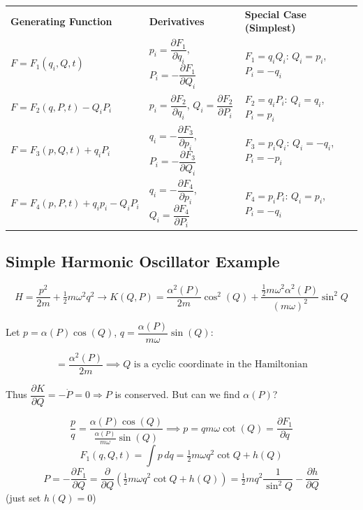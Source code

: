 \begin{center}
\begin{tabular}{lll}
    \textbf{Generating Function} & \textbf{Derivatives} & \textbf{Special Case (Simplest)} \\[6pt]
    $F = F_1(q_i, Q, t)$ & $p_i = \dfrac{\partial F_1}{\partial q_i}$,\; $P_i = -\dfrac{\partial F_1}{\partial Q_i}$ & $F_1 = q_i Q_i$:\; $Q_i = p_i$,\; $P_i = -q_i$ \\[8pt]
    $F = F_2(q, P, t) - Q_i P_i$ & $p_i = \dfrac{\partial F_2}{\partial q_i}$,\; $Q_i = \dfrac{\partial F_2}{\partial P_i}$ & $F_2 = q_i P_i$:\; $Q_i = q_i$,\; $P_i = p_i$ \\[8pt]
    $F = F_3(p, Q, t) + q_i P_i$ & $q_i = -\dfrac{\partial F_3}{\partial p_i}$,\; $P_i = -\dfrac{\partial F_3}{\partial Q_i}$ & $F_3 = p_i Q_i$:\; $Q_i = -q_i$,\; $P_i = -p_i$ \\[8pt]
    $F = F_4(p, P, t) + q_i p_i - Q_i P_i$ & $q_i = -\dfrac{\partial F_4}{\partial p_i}$,\; $Q_i = \dfrac{\partial F_4}{\partial P_i}$ & $F_4 = p_i P_i$:\; $Q_i = p_i$,\; $P_i = -q_i$ \\
\end{tabular}
\end{center}

\subsection*{Simple Harmonic Oscillator Example}

\[
    H = \frac{p^2}{2m} + \tfrac{1}{2}m\omega^2 q^2 \to K(Q,P) = \frac{\alpha^2(P)}{2m}\cos^2(Q) + \frac{\tfrac{1}{2}m\omega^2\alpha^2(P)}{(m\omega)^2}\sin^2 Q
\]

Let $p = \alpha(P)\cos(Q)$, $q = \dfrac{\alpha(P)}{m\omega}\sin(Q)$:

\[
    = \frac{\alpha^2(P)}{2m} \implies Q \text{ is a cyclic coordinate in the Hamiltonian}
\]

Thus $\dfrac{\partial K}{\partial Q} = -\dot{P} = 0 \Rightarrow P$ is conserved. But can we find $\alpha(P)$?

\[
    \frac{p}{q} = \frac{\alpha(P)\cos(Q)}{\frac{\alpha(P)}{m\omega}\sin(Q)} \implies p = qm\omega\cot(Q) = \frac{\partial F_1}{\partial q}
\]
\[
    F_1(q, Q, t) = \int p\,dq = \tfrac{1}{2}m\omega q^2\cot Q + h(Q)
\]
\[
    P = -\frac{\partial F_1}{\partial Q} = \frac{\partial}{\partial Q}\!\left(\tfrac{1}{2}m\omega q^2\cot Q + h(Q)\right) = \tfrac{1}{2}mq^2\frac{1}{\sin^2 Q} - \frac{\partial h}{\partial Q}
\]
(just set $h(Q)=0$)

